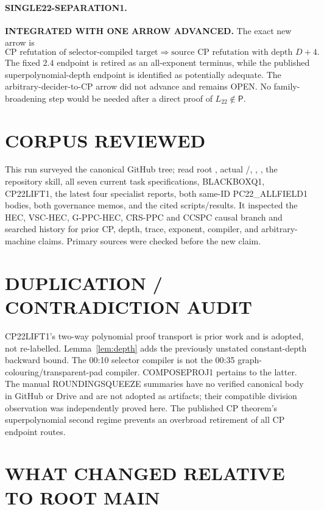 \documentclass[11pt]{article}
\newcommand{\Ltwo}{L_{22}}
\begin{document}
\paragraph{SINGLE22-SEPARATION1.}
\textbf{INTEGRATED WITH ONE ARROW ADVANCED.}  The exact new arrow is
\[
 \text{CP refutation of selector-compiled target}
 \Longrightarrow
 \text{source CP refutation with depth }D+4.                         \tag{6}
\]
The fixed $2.4$ endpoint is retired as an all-exponent terminus, while the
published superpolynomial-depth endpoint is identified as potentially
adequate.  The arbitrary-decider-to-CP arrow did not advance and remains
OPEN.  No family-broadening step would be needed after a direct proof of
\(\Ltwo\notin\mathsf P\).

\section{CORPUS REVIEWED}

This run surveyed the canonical GitHub tree; read root ,
actual /, ,
, the repository skill, all seven current task
specifications, BLACKBOXQ1, CP22LIFT1, the latest four specialist reports,
both same-ID PC22\_ALLFIELD1 bodies, both governance memos, and the cited
scripts/results.  It inspected the HEC, VSC-HEC, G-PPC-HEC, CRS-PPC and
CCSPC causal branch and searched history for prior CP, depth, trace,
exponent, compiler, and arbitrary-machine claims.  Primary sources were
checked before the new claim.

\section{DUPLICATION / CONTRADICTION AUDIT}

CP22LIFT1's two-way polynomial proof transport is prior work and is adopted,
not re-labelled.  Lemma~\ref{lem:depth} adds the previously unstated
constant-depth backward bound.  The 00:10 selector compiler is not the 00:35
graph-colouring/transparent-pad compiler.  COMPOSEPROJ1 pertains to the
latter.  The manual ROUNDINGSQUEEZE summaries have no verified canonical
body in GitHub or Drive and are not adopted as artifacts; their compatible
division observation was independently proved here.  The published CP
theorem's superpolynomial second regime prevents an overbroad retirement of
all CP endpoint routes.

\section{WHAT CHANGED RELATIVE TO ROOT MAIN}
\end{document}
